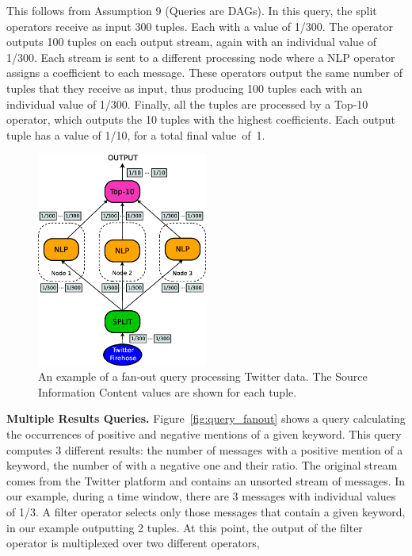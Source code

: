 This follows from Assumption 9 (Queries are DAGs). In this query, the split operators receive as input
300 tuples. Each with a \sic value of 1/300.  The operator outputs 100 tuples on each output stream,
again with an individual \sic value of 1/300. Each stream is sent to a different processing node where a
NLP operator assigns a coefficient to each message. These operators output the same number of tuples
that they receive as input, thus producing 100 tuples each with an individual \sic value of 1/300.
Finally, all the tuples are processed by a Top-10 operator, which outputs the 10 tuples with the
highest coefficients. Each output tuple has a \sic value of 1/10, for a total final \sic value~of~1.

\begin{figure}[t!]
	\centering 
	\includegraphics[width=0.5\textwidth]{img/tesi/fan-out_mr} 
	\caption{An example of a fan-out query processing Twitter data. 
	The Source Information Content values are shown for each tuple.}
	\label{fig:fanout_mr}
\end{figure}
\vspace{15pt}
\textbf{Multiple Results Queries.} Figure~\ref{fig:query_fanout} shows a query calculating the
occurrences of positive and negative mentions of a given keyword. 
This query computes 3 different results: the number of messages with a positive mention of a keyword,
the number of with a negative one and their ratio.
The original stream comes from the Twitter platform and contains an unsorted stream of messages. In our
example, during a time window, there are 3 messages with individual \sic values of 1/3. A filter
operator selects only those messages that contain a given keyword, in our example outputting 2
tuples.
At this point, the output of the filter operator is multiplexed over two different operators,
